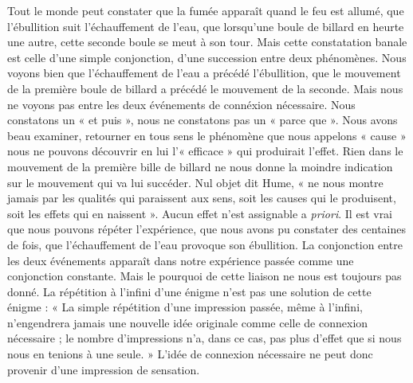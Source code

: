 Tout le monde peut constater que la fumée apparaît
quand le feu est allumé, que l’ébullition suit l’échauffement
de l’eau, que lorsqu'une boule de billard en heurte une
autre, cette seconde boule se meut à son tour. Mais cette
constatation banale est celle d’une simple conjonction,
d’une succession entre deux phénomènes. Nous voyons
bien que l’échauffement de l’eau a précédé l’ébullition,
que le mouvement de la première boule de billard a précédé
le mouvement de la seconde. Mais nous ne voyons pas
entre les deux événements de connéxion nécessaire. Nous
constatons un « et puis », nous ne constatons pas un
« parce que ». Nous avons beau examiner, retourner en
tous sens le phénomène que nous appelons « cause » nous
ne pouvons découvrir en lui l'« efficace » qui produirait
l'effet. Rien dans le mouvement de la première bille de
billard ne nous donne la moindre indication sur le mouvement
qui va lui succéder. Nul objet dit Hume, « ne nous
montre jamais par les qualités qui paraissent aux sens,
soit les causes qui le produisent, soit les effets qui en
naissent ». Aucun effet n’est assignable a {\it priori}. Il est
vrai que nous pouvons répéter l'expérience, que nous
avons pu constater des centaines de fois, que l’échauffement de l’eau provoque son ébullition. La conjonction
entre les deux événements apparaît dans notre expérience
passée comme une conjonction constante. Mais le pourquoi
de cette liaison ne nous est toujours pas donné. La répétition
à l'infini d’une énigme n’est pas une solution de cette
énigme : « La simple répétition d’une impression passée,
même à l'infini, n’engendrera jamais une nouvelle idée
originale comme celle de connexion nécessaire ; le nombre
d’impressions n’a, dans ce cas, pas plus d'effet que si nous
nous en tenions à une seule. » L'idée de connexion nécessaire ne peut donc provenir d’une impression de sensation.

